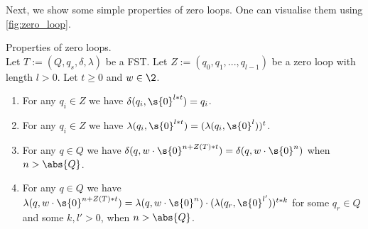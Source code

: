 Next, we show some simple properties of zero loops. One can visualise them using \cref{fig:zero_loop}.
\begin{proposition}{Properties of zero loops.}\label{zloop_props}\\
	Let $T :=(Q,q_s,\delta,\lambda)$ be a FST.
	Let $Z := (q_0,q_1,...,q_{l-1})$ be a zero loop with length $l>0$.
	Let $t \geq 0$ and $w \in \2$.
	\begin{enumerate}
		\item For any $q_i \in Z$ we have $\delta(q_i,\s{0}^{l*t})=q_i$. \label{zloops_props.0}
		\item For any $q_i \in Z$ we have $\lambda(q_i,\s{0}^{l*t})=(\lambda(q_i,\s{0}^l))^t$. \label{zloops_props.1}
		\item For any $q\in Q$ we have $\delta(q,w\cdot \s{0}^{n+Z(T)*t})=\delta(q,w\cdot\s{0}^{n})$ when $n > \abs{Q}$. \label{zloop_props.3}
		\item For any $q\in Q$ we have $\lambda(q,w\cdot \s{0}^{n+Z(T)*t})=\lambda(q,w\cdot \s{0}^{n})\cdot(\lambda(q_r,\s{0}^{l'}))^{t*k}$ for some $q_r \in Q$ and some $k,l'>0$, when $n > \abs{Q}$. \label{zloop_props.4}
	\end{enumerate}


\end{proposition}
